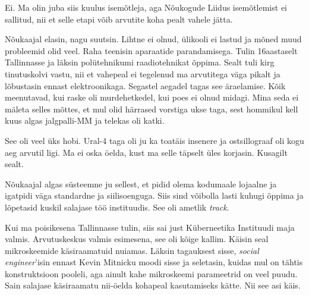 
Ei. Ma olin juba siis kuulus isemõtleja, aga Nõukogude Liidus 
isemõtlemist ei sallitud, nii et selle etapi võib arvutite 
koha pealt vahele jätta. 

Nõukaajal elasin, nagu suutsin. Lihtne ei 
olnud, ülikooli ei lastud ja mõned muud probleemid olid veel. Raha
teenisin aparaatide parandamisega. Tulin 16aastaselt 
Tallinnasse ja läksin polütehnikumi 
raadiotehnikat õppima. Sealt tuli kirg tinutuskolvi vastu, nii et vahepeal ei tegelenud ma arvutitega väga 
pikalt ja lõbustasin ennast 
elektroonikaga. Segastel aegadel tagas see
äraelamise. Kõik meenutavad, kui raske oli murdehetkedel, kui 
poes ei olnud midagi. Mina seda ei mäleta selles mõttes, et 
mul olid härrased vorstiga ukse taga, sest hommikul kell 
kuus algas jalgpalli-MM ja telekas oli katki. 


See oli veel üks hobi. Ural-4 
taga oli ju ka toatäis insenere ja ostsillograaf 
oli kogu aeg arvutil ligi. Ma ei oska öelda, kust ma selle täpselt üles 
korjasin. Kusagilt sealt. 


Nõukaajal algas süsteemne ju sellest, et pidid olema kodumaale lojaalne ja 
igatpidi väga standardne ja siilisoenguga. Siis sind võibolla lasti kuhugi 
õppima ja lõpetasid kuskil salajase töö instituudis. See oli ametlik \emph{track}. 

Kui ma poisikesena Tallinnasse tulin, siis sai just Küberneetika Instituudi maja valmis. Arvutuskeskus valmis esimesena, see oli kõige kallim. Käisin seal
mikroskeemide käsiraamatuid nuiamas. Läksin tagauksest sisse, \emph{social 
engineer}'isin ennast Kevin Mitnicku moodi sisse ja 
seletasin, kuidas mul on tähtis konstruktsioon pooleli, aga ainult 
kahe mikroskeemi parameetrid on veel puudu. Sain salajase 
käsiraamatu nii-öelda kohapeal kasutamiseks kätte. Nii see asi käis. 


